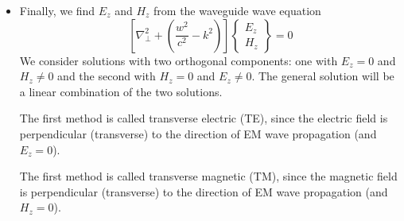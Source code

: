 \documentclass[11pt, a4paper]{article}
\renewcommand{\laplacian}{\nabla^{2}}
\begin{document}
\begin{itemize}
	\item Finally, we find $ E_{z} $ and $ H_{z} $ from the waveguide wave equation
	\begin{equation*}
		\left[\laplacian_{\perp} + \left(\frac{w^{2}}{c^{2}} - k^{2}\right)\right]
		\begin{Bmatrix}
		E_{z}\\
		H_{z}
		\end{Bmatrix}
		= 0
	\end{equation*}
	We consider solutions with two orthogonal components: one with $ E_{z} = 0 $ and $ H_{z} \neq 0 $ and the second with $ H_{z} = 0 $ and $ E_{z} \neq 0 $. The general solution will be a linear combination of the two solutions.
	
	The first method is called transverse electric (TE), since the electric field is perpendicular (transverse) to the direction of EM wave propagation (and $ E_{z} = 0 $). 
	
	The first method is called transverse magnetic (TM), since the magnetic field is perpendicular (transverse) to the direction of EM wave propagation (and $ H_{z} = 0 $). 
	
	
\end{itemize}
\end{document}
